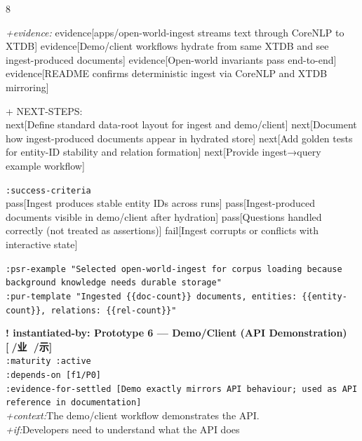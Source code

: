 \documentclass[landscape]{article}
\newcommand{\flexitag}[1]{\textcolor[gray]{0.35}{\textit{#1}}}
\newenvironment{devmapactive}{%
  \def\FrameCommand{\colorbox{devmapactivebg}}%
  \setlength{\fboxsep}{2pt}%
  \MakeFramed{\advance\hsize-\width \FrameRestore}%
}{\endMakeFramed}
\begin{document}
\begin{paracol}{8}
\begin{devmapactive}
  \flexitag{+evidence:} evidence[apps/open-world-ingest streams text through CoreNLP to XTDB] evidence[Demo/client workflows hydrate from same XTDB and see ingest-produced documents] evidence[Open-world invariants pass end-to-end] evidence[README confirms deterministic ingest via CoreNLP and XTDB mirroring]\\
\par
  + NEXT-STEPS:\\
    next[Define standard data-root layout for ingest and demo/client] next[Document how ingest-produced documents appear in hydrated store] next[Add golden tests for entity-ID stability and relation formation] next[Provide ingest→query example workflow]\\
\par
  \texttt{:\allowbreak{}success-\allowbreak{}criteria}\\
    pass[Ingest produces stable entity IDs across runs] pass[Ingest-produced documents visible in demo/client after hydration] pass[Questions handled correctly (not treated as assertions)] fail[Ingest corrupts or conflicts with interactive state]\\
\par
  \texttt{:\allowbreak{}psr-\allowbreak{}example "Selected open-\allowbreak{}world-\allowbreak{}ingest for corpus loading because background knowledge needs durable storage"}\\
  \texttt{:\allowbreak{}pur-\allowbreak{}template "Ingested \{\{doc-\allowbreak{}count\}\} documents,\allowbreak{} entities:\allowbreak{} \{\{entity-\allowbreak{}count\}\},\allowbreak{} relations:\allowbreak{} \{\{rel-\allowbreak{}count\}\}"}\\
\par
\par
\end{devmapactive}
\begin{devmapactive}
\textbf{! instantiated-by: Prototype 6 — Demo/Client (API Demonstration) [💖/业 📁/示]}\\
  \texttt{:\allowbreak{}maturity :\allowbreak{}active}\\
  \texttt{:\allowbreak{}depends-\allowbreak{}on [f1/\allowbreak{}P0]}\\
  \texttt{:\allowbreak{}evidence-\allowbreak{}for-\allowbreak{}settled [Demo exactly mirrors API behaviour;\allowbreak{} used as API reference in documentation]}\\
  \flexitag{+context:}The demo/client workflow demonstrates the API.\\
  \flexitag{+if:}Developers need to understand what the API does\\

\end{devmapactive}
\end{paracol}
\end{document}
